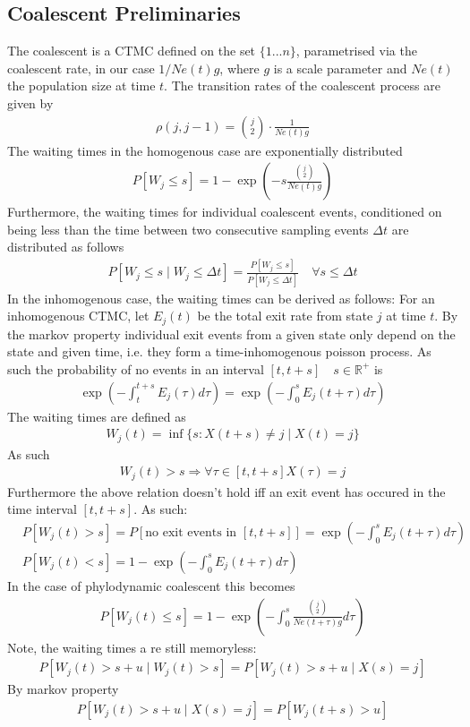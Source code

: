 \documentclass{article}
\newcommand{\R}{\mathbb{R}}
\theoremstyle{definition}
\begin{document}
\subsection{Coalescent Preliminaries}
The coalescent is a CTMC defined on the set $\{1 ... n\}$, parametrised via the coalescent rate, in our case $1/Ne(t)g$, where $g$ is a scale parameter and $Ne(t)$ the population size at time $t$. 
The transition rates of the coalescent process are given by 
\begin{gather*}
\rho(j, j-1) = \binom{j}{2}\cdot\frac{1}{Ne(t)g}
\end{gather*}
The waiting times in the homogenous case are exponentially distributed
\begin{gather*}
P[W_j \leq s] = 1-\exp(-s\frac{\binom{j}{2}}{Ne(t)g})
\end{gather*}
Furthermore, the waiting times for individual coalescent events, conditioned on being less than the time between two consecutive sampling events $\Delta t$ are distributed as follows
\begin{gather}\label{eq:conditional}
P[W_j \leq s\mid W_j \leq \Delta t ] = \frac{P[W_j \leq s]}{P[W_j \leq \Delta t]} \quad\forall s \leq \Delta t
\end{gather}
In the inhomogenous case, the waiting times can be derived as follows:
For an inhomogenous CTMC, let $E_j(t)$ be the total exit rate from state $j$ at time $t$.
By the markov property individual exit events from a given state only depend on the state and given time, i.e. they form a time-inhomogenous poisson process.
As such the probability of no events in an interval $[t,t+s]\quad s\in \R^+$ is 
\begin{gather}
\exp(-\int_t^{t+s}E_j(\tau)d\tau) = \exp(-\int_0^{s}E_j(t+\tau)d\tau)
\end{gather}
The waiting times are defined as
\begin{gather}
W_j(t) = \inf\{s:X(t+s)\neq j \mid X(t) = j\}
\end{gather}
As such
\begin{gather}
W_j(t) > s \Rightarrow \forall \tau\in[t, t+s] X(\tau) = j
\end{gather}
Furthermore the above relation doesn't hold iff an exit event has occured in the time interval $[t,t+s]$. As such:
\begin{align*}
&P[W_j(t) > s] = P[\text{no exit events in }[t,t+s]] = \exp(-\int_0^{s}E_j(t+\tau)d\tau)\\
&P[W_j(t) < s] = 1 - \exp(-\int_0^{s}E_j(t+\tau)d\tau)
\end{align*}
In the case of phylodynamic coalescent this becomes
\begin{gather}
P[W_j(t) \leq s] = 1 - \exp(-\int_0^{s}\frac{\binom{j}{2}}{Ne(t+\tau)g}d\tau)
\end{gather}
\newpage
Note, the waiting times a
re still memoryless:
\begin{gather}
P\left[W_j(t) > s+u\mid W_j(t)>s \right] = P\left[W_j(t) > s+u\mid X(s)=j\right]
\end{gather}
By markov property
\begin{gather}
P\left[W_j(t) > s+u\mid X(s)=j\right] = P\left[W_j(t+s) > u\right]
\end{gather}
\end{document}
